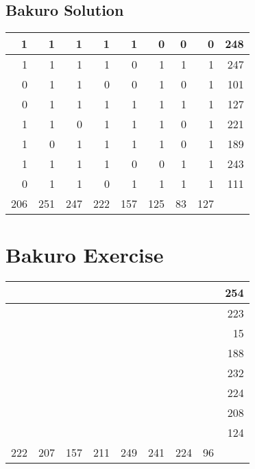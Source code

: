 \documentclass[]{article}
\begin{document}
 \subsection{Bakuro Solution} 
\begin{tabular}{rrrrrrrrr}
\hline
   1 &   1 &   1 &   1 &   1 &   0 &  0 &   0 & 248 \\ \hline
   1 &   1 &   1 &   1 &   0 &   1 &  1 &   1 & 247 \\ \hline
   0 &   1 &   1 &   0 &   0 &   1 &  0 &   1 & 101 \\ \hline
   0 &   1 &   1 &   1 &   1 &   1 &  1 &   1 & 127 \\ \hline
   1 &   1 &   0 &   1 &   1 &   1 &  0 &   1 & 221 \\ \hline
   1 &   0 &   1 &   1 &   1 &   1 &  0 &   1 & 189 \\ \hline
   1 &   1 &   1 &   1 &   0 &   0 &  1 &   1 & 243 \\ \hline
   0 &   1 &   1 &   0 &   1 &   1 &  1 &   1 & 111 \\ \hline
 206 & 251 & 247 & 222 & 157 & 125 & 83 & 127 &     \\ \hline
\hline
\end{tabular}\newpage\section{Bakuro Exercise}\begin{tabular}{rrrrrrrrr}
\hline
     &     &     &     &     &     &     &    & 254 \\ \hline
     &     &     &     &     &     &     &    & 223 \\ \hline
     &     &     &     &     &     &     &    &  15 \\ \hline
     &     &     &     &     &     &     &    & 188 \\ \hline
     &     &     &     &     &     &     &    & 232 \\ \hline
     &     &     &     &     &     &     &    & 224 \\ \hline
     &     &     &     &     &     &     &    & 208 \\ \hline
     &     &     &     &     &     &     &    & 124 \\ \hline
 222 & 207 & 157 & 211 & 249 & 241 & 224 & 96 &     \\ \hline
\hline
\end{tabular}\newpage 
\end{document}
